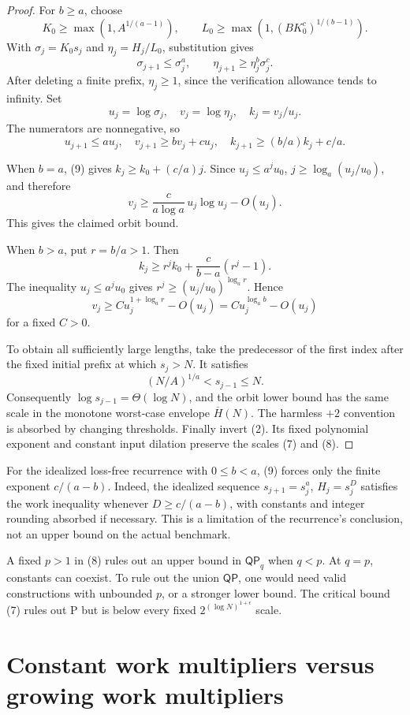 \documentclass[11pt]{article}
\newcommand{\QP}{\mathsf{QP}}
\newcommand{\Hbar}{\overline H}
\begin{document}
\begin{proof}
For $b\ge a$, choose
\[
 K_0\ge\max(1,A^{1/(a-1)}),\qquad
 L_0\ge\max(1,(BK_0^c)^{1/(b-1)}).
\]
With $\sigma_j=K_0s_j$ and $\eta_j=H_j/L_0$, substitution gives
\[
 \sigma_{j+1}\le\sigma_j^a,\qquad
 \eta_{j+1}\ge\eta_j^b\sigma_j^c.
\]
After deleting a finite prefix, $\eta_j\ge1$, since the verification
allowance tends to infinity. Set
\[
 u_j=\log\sigma_j,\quad v_j=\log\eta_j,\quad k_j=v_j/u_j.
\]
The numerators are nonnegative, so
\[
 u_{j+1}\le au_j,\quad v_{j+1}\ge bv_j+cu_j,\quad
 k_{j+1}\ge(b/a)k_j+c/a.
 \tag{9}
\]

When $b=a$, (9) gives $k_j\ge k_0+(c/a)j$.
Since $u_j\le a^ju_0$, $j\ge\log_a(u_j/u_0)$, and therefore
\[
 v_j\ge\frac{c}{a\log a}\,u_j\log u_j-O(u_j).
 \tag{10}
\]
This gives the claimed orbit bound.

When $b>a$, put $r=b/a>1$. Then
\[
 k_j\ge r^jk_0+\frac{c}{b-a}(r^j-1).
\]
The inequality $u_j\le a^ju_0$ gives
$r^j\ge(u_j/u_0)^{\log_a r}$. Hence
\[
 v_j\ge C u_j^{1+\log_a r}-O(u_j)
       =C u_j^{\log_a b}-O(u_j)
\]
for a fixed $C>0$.

To obtain all sufficiently large lengths, take the predecessor of the
first index after the fixed initial prefix at which $s_j>N$. It satisfies
\[
 (N/A)^{1/a}<s_{j-1}\le N.
\]
Consequently $\log s_{j-1}=\Theta(\log N)$, and the orbit lower bound
has the same scale in the monotone worst-case envelope $\Hbar(N)$.
The harmless $+2$ convention is absorbed by changing thresholds.
Finally invert (2). Its fixed polynomial exponent and constant input
dilation preserve the scales (7) and (8).
\end{proof}

For the idealized loss-free recurrence with $0\le b<a$, (9) forces only the finite
exponent $c/(a-b)$. Indeed, the idealized sequence
$s_{j+1}=s_j^a$, $H_j=s_j^D$ satisfies the work inequality whenever
$D\ge c/(a-b)$, with constants and integer rounding absorbed if necessary.
This is a limitation of the recurrence's conclusion, not an upper bound
on the actual benchmark.

A fixed $p>1$ in (8) rules out an upper bound in $\QP_q$ when $q<p$.
At $q=p$, constants can coexist. To rule out the union $\QP$, one would
need valid constructions with unbounded $p$, or a stronger lower bound.
The critical bound (7) rules out P but is below every fixed
$2^{(\log N)^{1+\epsilon}}$ scale.

\section{Constant work multipliers versus growing work multipliers}
\end{document}
